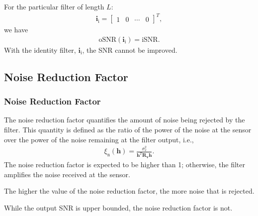 \documentclass[10pt,pdflatex,headrule,landscape]{beamer}
\begin{document}
\begin{frame}

For the particular filter of length $L$:
\begin{eqnarray}
 \mathbf{i}_{\mathrm{i}} = \left[ \begin{array}{cccc} 1 & 0 & \cdots & 0 \end{array} \right]^T,
\end{eqnarray}
we have
\begin{eqnarray}
 \mathrm{oSNR}\left( \mathbf{i}_{\mathrm{i}} \right) = \mathrm{iSNR}.
\end{eqnarray}
With the identity filter, $\mathbf{i}_{\mathrm{i}}$, the SNR cannot be improved.

\end{frame}

\subsection{Noise Reduction Factor}
\begin{frame}
    \frametitle{Noise Reduction Factor}

The noise reduction factor quantifies the amount of noise being rejected by the filter. This quantity is defined as the ratio of the power of the noise at the sensor over the power of the noise remaining at the filter output, i.e.,
\begin{eqnarray}
\label{C2-NRF}
 \xi_{\mathrm{n}}\left(\mathbf{h} \right) = \frac{ \sigma_v^2 } { \mathbf{h}^T \mathbf{R}_{\mathbf{v}} \mathbf{h} }.
\end{eqnarray}
The noise reduction factor is expected to be higher than 1; otherwise, the filter amplifies the noise received at the sensor.

The higher the value of the noise reduction factor, the more noise that is rejected.

While the output SNR is upper bounded, the noise reduction factor is not.

\end{frame}
\end{document}
